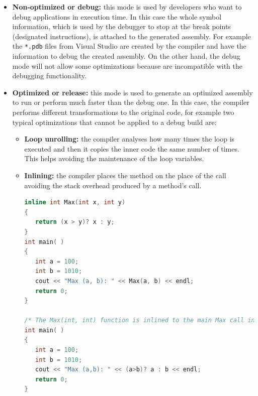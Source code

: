 \begin{itemize}
  \item \textbf{Non-optimized or debug:} this mode is used by developers who want to debug applications in execution time. In this case the whole symbol information, which is used by the debugger to stop at the break points (designated instructions), is attached to the generated assembly. For example the \verb!*.pdb! files from Visual Studio are created by the compiler and have the information to debug the created assembly. On the other hand, the debug mode will not allow some optimizations because are incompatible with the debugging functionality.
  \item \textbf{Optimized or release:} this mode is used to generate an optimized assembly to run or perform much faster than the debug one. In this case, the compiler performs different transformations to the original code, for example two typical optimizations that cannot be applied to a debug build are:
  \begin{itemize}
  	\item \textbf{Loop unrolling:} the compiler analyses how many times the loop is executed and then it copies the inner code the same number of times. This helps avoiding the maintenance of the loop variables.
  	\item \textbf{Inlining:} the compiler places the method on the place of the call avoiding the stack overhead produced by a method's call.
  	\begin{lstlisting}[language=C++, caption={Inline example}]
inline int Max(int x, int y)
{
   return (x > y)? x : y;
}
int main( )
{
   int a = 100;
   int b = 1010;
   cout << "Max (a, b): " << Max(a, b) << endl;
   return 0;
}

/* The Max(int, int) function is inlined to the main Max call in the following way:*/
int main( )
{
   int a = 100;
   int b = 1010;
   cout << "Max (a,b): " << (a>b)? a : b << endl;
   return 0;
}
\end{lstlisting}
  \end{itemize}
\end{itemize}

